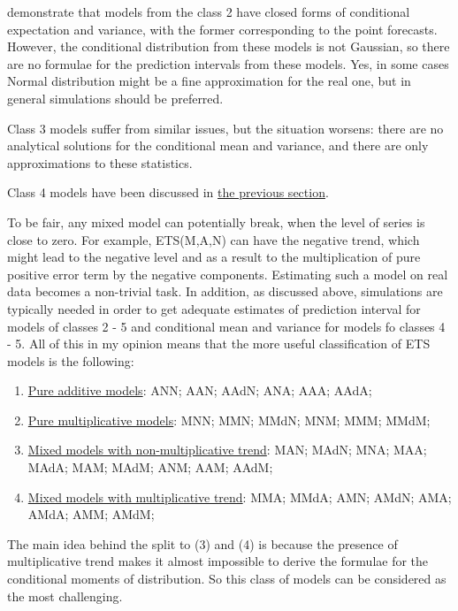 \documentclass[
]{book}
\providecommand{\tightlist}{%
  \setlength{\itemsep}{0pt}\setlength{\parskip}{0pt}}
\theoremstyle{definition}
\theoremstyle{definition}
\theoremstyle{definition}
\theoremstyle{definition}
\theoremstyle{remark}
\begin{document}
\citet{Hyndman2008b} demonstrate that models from the class 2 have closed forms of conditional expectation and variance, with the former corresponding to the point forecasts. However, the conditional distribution from these models is not Gaussian, so there are no formulae for the prediction intervals from these models. Yes, in some cases Normal distribution might be a fine approximation for the real one, but in general simulations should be preferred.

Class 3 models suffer from similar issues, but the situation worsens: there are no analytical solutions for the conditional mean and variance, and there are only approximations to these statistics.

Class 4 models have been discussed in \protect\hyperlink{ADAMETSPureMultiplicative}{the previous section}.

To be fair, any mixed model can potentially break, when the level of series is close to zero. For example, ETS(M,A,N) can have the negative trend, which might lead to the negative level and as a result to the multiplication of pure positive error term by the negative components. Estimating such a model on real data becomes a non-trivial task. In addition, as discussed above, simulations are typically needed in order to get adequate estimates of prediction interval for models of classes 2 - 5 and conditional mean and variance for models fo classes 4 - 5. All of this in my opinion means that the more useful classification of ETS models is the following:

\begin{enumerate}
\def\labelenumi{\arabic{enumi}.}
\tightlist
\item
  \protect\hyperlink{ADAMETSPureAdditive}{Pure additive models}: ANN; AAN; AAdN; ANA; AAA; AAdA;
\item
  \protect\hyperlink{ADAMETSPureMultiplicative}{Pure multiplicative models}: MNN; MMN; MMdN; MNM; MMM; MMdM;
\item
  \protect\hyperlink{ADAMETSMixedModelsGroup3}{Mixed models with non-multiplicative trend}: MAN; MAdN; MNA; MAA; MAdA; MAM; MAdM; ANM; AAM; AAdM;
\item
  \protect\hyperlink{ADAMETSMixedModelsGroup4}{Mixed models with multiplicative trend}: MMA; MMdA; AMN; AMdN; AMA; AMdA; AMM; AMdM;
\end{enumerate}

The main idea behind the split to (3) and (4) is because the presence of multiplicative trend makes it almost impossible to derive the formulae for the conditional moments of distribution. So this class of models can be considered as the most challenging.
\end{document}

